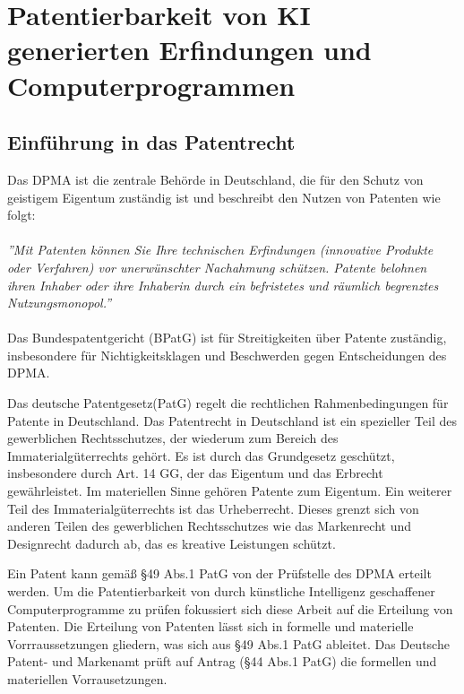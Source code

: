 \chapter{Patentierbarkeit von KI generierten Erfindungen und Computerprogrammen \label{cha:chapter3}}


\section{Einführung in das Patentrecht\label{sec:Patentrecht}}


Das \gls{DPMA} ist die zentrale Behörde in Deutschland, 
die für den Schutz von geistigem Eigentum zuständig ist und 
beschreibt den Nutzen von Patenten wie folgt:
\\
\\
\textit{''Mit Patenten können Sie Ihre technischen Erfindungen 
(innovative Produkte oder Verfahren) vor unerwünschter Nachahmung schützen. 
Patente belohnen ihren Inhaber 
oder ihre Inhaberin durch ein befristetes und räumlich begrenztes Nutzungsmonopol.''} 
\cite{DPMAPatentschutz}
\\
\\
Das Bundespatentgericht (BPatG) ist für Streitigkeiten über Patente zuständig, 
insbesondere für Nichtigkeitsklagen und Beschwerden gegen Entscheidungen des DPMA.

Das deutsche Patentgesetz(PatG) \cite{PatGNichtamtlichesInhaltsverzeichnis} 
regelt die rechtlichen Rahmenbedingungen für Patente in Deutschland.
Das Patentrecht in Deutschland ist ein spezieller Teil des gewerblichen Rechtsschutzes, 
der wiederum zum Bereich des Immaterialgüterrechts gehört. 
Es ist durch das Grundgesetz geschützt, insbesondere durch Art. 14 GG, 
der das Eigentum und das Erbrecht gewährleistet. 
Im materiellen Sinne gehören Patente zum Eigentum.
Ein weiterer Teil des Immaterialgüterrechts ist das Urheberrecht. 
Dieses grenzt sich von anderen Teilen des
gewerblichen Rechtsschutzes wie das Markenrecht und Designrecht dadurch ab, das 
es kreative Leistungen schützt\cite{GewerblicherRechtschutzUnd}. 


Ein Patent kann gemäß §49 Abs.1 PatG von der Prüfstelle des DPMA erteilt werden. 
Um die Patentierbarkeit von durch künstliche Intelligenz geschaffener Computerprogramme 
zu prüfen fokussiert sich diese Arbeit auf die Erteilung von Patenten. 
Die Erteilung von Patenten lässt sich in formelle und materielle Vorrraussetzungen 
gliedern, was sich aus §49 Abs.1 PatG ableitet. 
Das Deutsche Patent- und Markenamt prüft auf Antrag (§44 Abs.1 PatG) 
die formellen und materiellen Vorrausetzungen.

